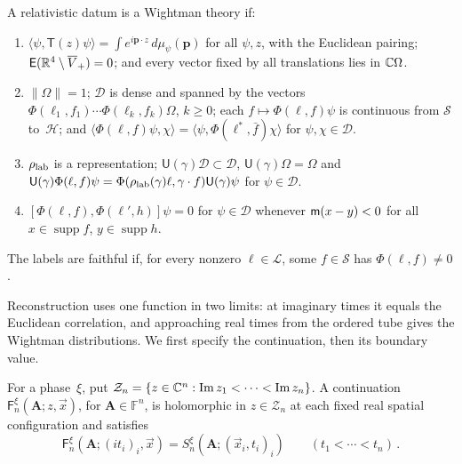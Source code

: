 \begin{definition}\label{def:wightman}
A relativistic datum is a Wightman theory if:
\begin{enumerate}[label=\textup{(W\arabic*)},ref=W\arabic*,start=0,nosep]
\item\label{def:W0} $\langle\psi,\mathsf T(z)\psi\rangle=\int e^{i\mathbf p\cdot z}\,d\mu_\psi(\mathbf p)$ for all $\psi,z$, with the Euclidean pairing; $\mathsf E(\mathbb{R}^4\setminus\overline{V}_+)=0$; and every vector fixed by all translations lies in $\mathbb{C}\Omega$.
\item\label{def:W1} $\|\Omega\|=1$; $\mathcal D$ is dense and spanned by the vectors $\Phi(\ell_1,f_1)\cdots\Phi(\ell_k,f_k)\Omega$, $k\ge0$; each $f\mapsto\Phi(\ell,f)\psi$ is continuous from $\mathcal S$ to~$\mathcal H$; and $\langle\Phi(\ell,f)\psi,\chi\rangle=\langle\psi,\Phi(\ell^*,\bar f)\chi\rangle$ for $\psi,\chi\in\mathcal D$.
\item\label{def:W2} $\rho_{\rm lab}$ is a representation; $\mathsf U(\gamma)\mathcal D\subset\mathcal D$, $\mathsf U(\gamma)\Omega=\Omega$ and $\mathsf U(\gamma)\Phi(\ell,f)\psi=\Phi(\rho_{\rm lab}(\gamma)\ell,\gamma\cdot f)\mathsf U(\gamma)\psi$ for $\psi\in\mathcal D$.
\item\label{def:W3} $[\Phi(\ell,f),\Phi(\ell',h)]\psi=0$ for $\psi\in\mathcal D$ whenever $\mathsf{m}(x-y)<0$ for all $x\in\operatorname{supp}f$, $y\in\operatorname{supp}h$.
\end{enumerate}
\end{definition}

\begin{definition}\label{def:D14c}
The labels are faithful if, for every nonzero $\ell\in\mathcal L$, some $f\in\mathcal S$ has $\Phi(\ell,f)\ne0$.
\end{definition}

Reconstruction uses one function in two limits: at imaginary times it equals the Euclidean correlation, and approaching real times from the ordered tube gives the Wightman distributions. We first specify the continuation, then its boundary value.

\begin{definition}\label{def:D15}
For a phase~$\xi$, put $\mathcal Z_n=\{z\in\mathbb{C}^n:\operatorname{Im}z_1<\cdots<\operatorname{Im}z_n\}$. A continuation $\mathsf F_n^\xi(\boldsymbol A;z,\vec x)$, for $\boldsymbol A\in\mathbb F^n$, is holomorphic in $z\in\mathcal Z_n$ at each fixed real spatial configuration and satisfies
\begin{equation*}
\mathsf F_n^\xi(\boldsymbol A;(it_i)_i,\vec x)=S_n^\xi(\boldsymbol A;(\vec x_i,t_i)_i)\qquad(t_1<\cdots<t_n)\,.
\end{equation*}
\end{definition}

